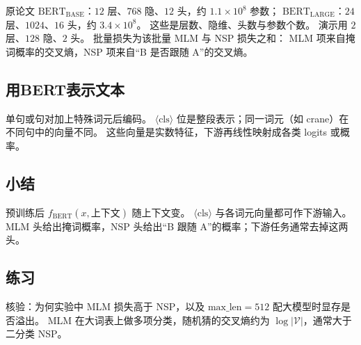 原论文 $\mathrm{BERT_{BASE}}$：$12$ 层、$768$ 隐、$12$ 头，约 $1.1\times 10^8$ 参数；
$\mathrm{BERT_{LARGE}}$：$24$ 层、$1024$、$16$ 头，约 $3.4\times 10^8$。
这些是层数、隐维、头数与参数个数。
演示用 $2$ 层、$128$ 隐、$2$ 头。
批量损失为该批量 MLM 与 NSP 损失之和：
MLM 项来自掩词概率的交叉熵，NSP 项来自“B 是否跟随 A”的交叉熵。

\subsection{用BERT表示文本}

单句或句对加上特殊词元后编码。
$\langle\mathrm{cls}\rangle$ 位是整段表示；同一词元（如 crane）在不同句中的向量不同。
这些向量是实数特征，下游再线性映射成各类 logits 或概率。

\subsection{小结}

预训练后 $f_{\mathrm{BERT}}(x,\text{上下文})$ 随上下文变。
$\langle\mathrm{cls}\rangle$ 与各词元向量都可作下游输入。
MLM 头给出掩词概率，NSP 头给出“B 跟随 A”的概率；下游任务通常去掉这两头。

\subsection{练习}

核验：为何实验中 MLM 损失高于 NSP，以及 $\mathrm{max\_len}=512$ 配大模型时显存是否溢出。
MLM 在大词表上做多项分类，随机猜的交叉熵约为 $\log|\mathcal{V}|$，通常大于二分类 NSP。
